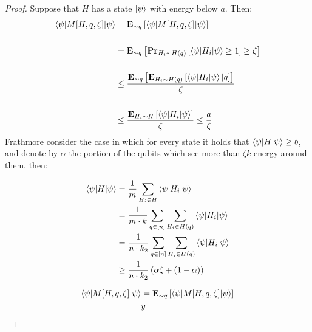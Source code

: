 \documentclass[manuscript,screen,review]{acmart}
\begin{document}
\begin{proof}
  Suppose that $H$ has a state $\ket{\psi}$ with energy below $a$. Then:  
  \begin{equation*}
    \begin{split}
      \braket{\psi|M[H,q,\zeta]|\psi} & =  \exppm{ \braket{\psi|M[H,q,\zeta]|\psi} }{\sim q} \\ 
      & \\
      & =\exppm{\prbm{ \braket{\psi|H_{i}|\psi} \ge 1 }{H_{i}\sim H(q)} \ge \zeta }{\sim q} \\
      & \\ 
      & \le  \frac{ \exppm{ \exppm{ \braket{\psi|H_{i}|\psi} | q }{ H_{i} \sim H(q)} }{ \sim q }  }{\zeta } \\
      & \\ 
      & \le  \frac{ \exppm{ \braket{\psi|H_{i}|\psi} }{ H_{i} \sim H }  }{\zeta } \le \frac{a}{\zeta}
    \end{split}
  \end{equation*}
  Frathmore consider the case in which for every state it holds that $\braket{\psi|H|\psi}\ge b$, and denote by $\alpha$ the portion of the qubits which see more than $\zeta k$ energy around them, then: 

  \begin{equation*}
    \begin{split}
    \braket{\psi|H|\psi}  & =  \frac{1}{m}\sum_{H_{i} \in H} {\braket{\psi|H_{i}|\psi} }  \\
    & = \frac{1}{m\cdot k}\sum_{q \in [n]}\sum_{H_{i} \in H(q)} {\braket{\psi|H_{i}|\psi} }  \\
    & = \frac{1}{n \cdot k_{2}}\sum_{q \in [n]}\sum_{H_{i} \in H(q)} {\braket{\psi|H_{i}|\psi} }  \\
    & \ge \frac{1}{n \cdot k_{2}} \left( \alpha \zeta + (1-\alpha) \right)
    \end{split}
  \end{equation*}

 \begin{equation*}
    \begin{split}
      \braket{\psi|M[H,q,\zeta]|\psi} & =  \exppm{ \braket{\psi|M[H,q,\zeta]|\psi} }{\sim q} \\ 
      & y
     \end{split}
  \end{equation*}
 

\end{proof}


\printbibliography
\end{document}

